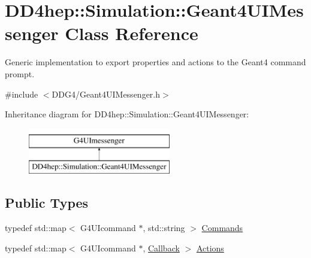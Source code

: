 \hypertarget{class_d_d4hep_1_1_simulation_1_1_geant4_u_i_messenger}{}\section{D\+D4hep\+:\+:Simulation\+:\+:Geant4\+U\+I\+Messenger Class Reference}
\label{class_d_d4hep_1_1_simulation_1_1_geant4_u_i_messenger}


Generic implementation to export properties and actions to the Geant4 command prompt.  




{\ttfamily \#include $<$D\+D\+G4/\+Geant4\+U\+I\+Messenger.\+h$>$}

Inheritance diagram for D\+D4hep\+:\+:Simulation\+:\+:Geant4\+U\+I\+Messenger\+:\begin{figure}[H]
\begin{center}
\leavevmode
\includegraphics[height=2.000000cm]{class_d_d4hep_1_1_simulation_1_1_geant4_u_i_messenger}
\end{center}
\end{figure}
\subsection*{Public Types}
\begin{DoxyCompactItemize}
\item 
typedef std\+::map$<$ G4\+U\+Icommand $\ast$, std\+::string $>$ \hyperlink{class_d_d4hep_1_1_simulation_1_1_geant4_u_i_messenger_a07e66059e5542ef6c393fda188f44907}{Commands}
\item 
typedef std\+::map$<$ G4\+U\+Icommand $\ast$, \hyperlink{class_d_d4hep_1_1_callback}{Callback} $>$ \hyperlink{class_d_d4hep_1_1_simulation_1_1_geant4_u_i_messenger_a91b01eab1bb56af8661d2c99660211cd}{Actions}
\end{DoxyCompactItemize}
